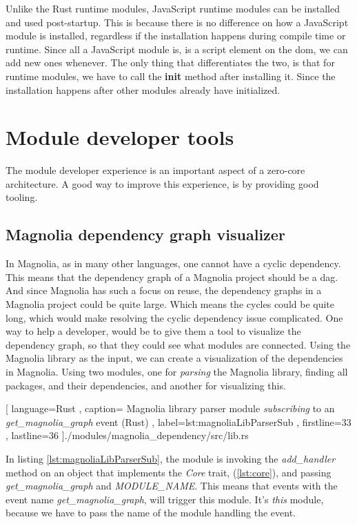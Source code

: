 Unlike the Rust runtime modules, JavaScript runtime modules can be installed and
used post-startup. This is because there is no difference on how a JavaScript
module is installed, regardless if the installation happens during compile time
or runtime. Since all a JavaScript module is, is a script element on the
\gls*{dom}, we can add new ones whenever. The only thing that differentiates the
two, is that for runtime modules, we have to call the \textbf{init} method after
installing it. Since the installation happens after other modules already have
initialized.


\section{Module developer tools} \label{sec:mdt}

The module developer experience is an important aspect of a zero-core
architecture. A good way to improve this experience, is by providing good
tooling.

\subsection{Magnolia dependency graph visualizer}

In Magnolia, as in many other languages, one cannot have a cyclic dependency.
This means that the dependency graph of a Magnolia project should be a
\gls*{dag}. And since Magnolia has such a focus on reuse, the dependency graphs
in a Magnolia project could be quite large. Which means the cycles could be
quite long, which would make resolving the cyclic dependency issue complicated.
One way to help a developer, would be to give them a tool to visualize the
dependency graph, so that they could see what modules are connected. Using the
Magnolia library as the input, we can create a visualization of the dependencies
in Magnolia. Using two modules, one for \textit{parsing} the Magnolia library,
finding all packages, and their dependencies, and another for visualizing
this.

\begin{center}
  
    [ language=Rust
    , caption={
      Magnolia library parser module \textit{subscribing} to an
      \textit{get\_magnolia\_graph } event (Rust)
    }
    , label=lst:magnoliaLibParserSub
    , firstline=33
    , lastline=36
    ]{./modules/magnolia\_dependency/src/lib.rs}
\end{center}

In listing \ref{lst:magnoliaLibParserSub}, the module is invoking the
\textit{add\_handler} method on an object that implements the \textit{Core} trait,
(\ref{lst:core}), and passing \textit{get\_magnolia\_graph} and
\textit{MODULE\_NAME}. This means that events with the event name
\textit{get\_magnolia\_graph}, will trigger this module. It's \textit{this}
module, because we have to pass the name of the module handling the event.

